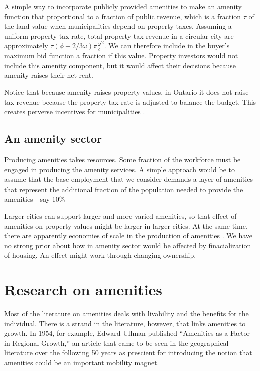 A simple way to incorporate publicly provided amenities to make an amenity function that proportional to a fraction of public revenue, which is a fraction $\tau$ of the land value when municipalities depend on property taxes. Assuming a uniform property tax rate, total property tax revenue in a circular city are approximately $\tau(\phi+2/3 \omega)\pi \frac{\omega}{c}^2$. We can therefore include in the buyer's maximum bid function a fraction if this value. Property investors would not include this amenity component, but it would affect their decisions because amenity raises their net rent.

Notice that because amenity raises property values, in Ontario it does not raise tax revenue because the property tax rate is adjusted to balance the budget. This creates perverse incentives for municipalities \cite{blaisPerverseCitiesHidden2011}.


\subsection{An amenity sector}
Producing amenities takes resources. Some fraction of the workforce must be engaged in producing the amenity services. A simple approach would be to assume that the base employment that we consider demands a layer of amenities that represent the additional fraction of the population needed to provide the amenities - say 10\%  

Larger cities can support larger and more varied amenities, so that effect of amenities on property values might be larger in larger cities. At the same time, there are apparently economies of scale in the production of amenities \cite{kaufmannScalingUrbanAmenities2022}. We have no strong prior about how in amenity sector would be affected by finacialization of housing.  An effect might work through changing ownership.


\section{Research on amenities}
Most of the literature on amenities deals with livability and the benefits for the individual. There is a strand in the literature, however, that links amenities to growth. In 1954, for example, Edward Ullman \cite{ullmanAmenitiesFactorRegional1954} published  ``Amenities as a Factor in Regional Growth,'' an article that came to be seen in the geographical literature over the following 50 years as prescient \cite{walcottCommentsEdwardUllman2010} for introducing the notion that amenities could be an important mobility magnet. 

